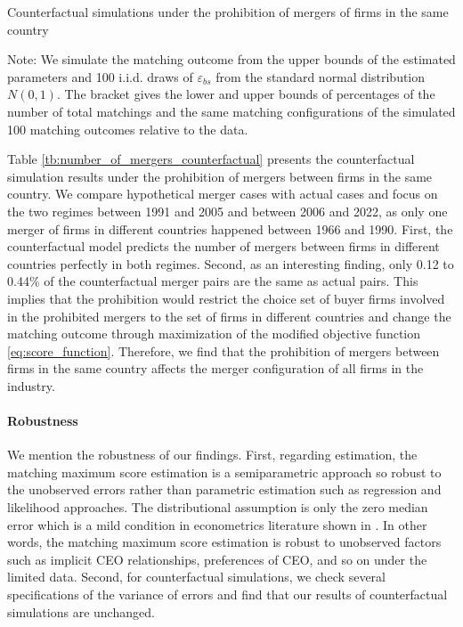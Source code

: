 \documentclass[10pt]{article}
\begin{document}
\begin{table}[!htbp]
  \begin{center}
      \caption{Counterfactual simulations under the prohibition of mergers of firms in the same country}
      \label{tb:number_of_mergers_counterfactual} 
      
  \end{center}\footnotesize
  Note: We simulate the matching outcome from the upper bounds of the estimated parameters and 100 i.i.d. draws of $\varepsilon_{bs}$ from the standard normal distribution $N(0,1)$. The bracket gives the lower and upper bounds of percentages of the number of total matchings and the same matching configurations of the simulated 100 matching outcomes relative to the data.
\end{table} 

Table \ref{tb:number_of_mergers_counterfactual} presents the counterfactual simulation results under the prohibition of mergers between firms in the same country. 
We compare hypothetical merger cases with actual cases and focus on the two regimes between 1991 and 2005 and between 2006 and 2022, as only one merger of firms in different countries happened between 1966 and 1990.
First, the counterfactual model predicts the number of mergers between firms in different countries perfectly in both regimes. 
Second, as an interesting finding, only 0.12 to 0.44\% of the counterfactual merger pairs are the same as actual pairs.
This implies that the prohibition would restrict the choice set of buyer firms involved in the prohibited mergers to the set of firms in different countries and change the matching outcome through maximization of the modified objective function \eqref{eq:score_function}.
Therefore, we find that the prohibition of mergers between firms in the same country affects the merger configuration of all firms in the industry.

\paragraph{Robustness}
We mention the robustness of our findings. First, regarding estimation, the matching maximum score estimation is a semiparametric approach so robust to the unobserved errors rather than parametric estimation such as regression and likelihood approaches. The distributional assumption is only the zero median error which is a mild condition in econometrics literature shown in \cite{manski1985semiparametric}. In other words, the matching maximum score estimation is robust to unobserved factors such as implicit CEO relationships, preferences of CEO, and so on under the limited data. 
Second, for counterfactual simulations, we check several specifications of the variance of errors and find that our results of counterfactual simulations are unchanged. 
\end{document}
